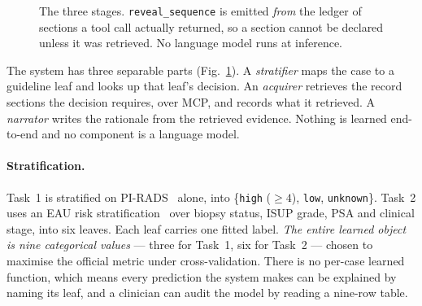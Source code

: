\documentclass[runningheads]{llncs}
\newcommand{\code}[1]{\texttt{\small #1}}
\begin{document}
\begin{figure}[t]
\centering
{}
\caption{The three stages. \code{reveal\_sequence} is emitted \emph{from} the
ledger of sections a tool call actually returned, so a section cannot be declared
unless it was retrieved. No language model runs at inference.}
\label{fig:arch}
\end{figure}

The system has three separable parts (Fig.~\ref{fig:arch}). A \emph{stratifier}
maps the case to a guideline leaf and looks up that leaf's decision. An
\emph{acquirer} retrieves the record sections the decision requires, over MCP, and
records what it retrieved. A \emph{narrator} writes the rationale from the
retrieved evidence. Nothing is learned end-to-end and no component is a language
model.

\paragraph{Stratification.}
Task~1 is stratified on PI-RADS~\cite{pirads} alone, into
\{\code{high} ($\geq 4$), \code{low}, \code{unknown}\}. Task~2 uses an EAU risk
stratification~\cite{eau} over biopsy status, ISUP grade, PSA and clinical stage,
into six leaves. Each leaf carries one fitted label. \emph{The entire learned
object is nine categorical values} --- three for Task~1, six for Task~2 --- chosen
to maximise the official metric under cross-validation. There is no per-case
learned function, which means every prediction the system makes can be explained by
naming its leaf, and a clinician can audit the model by reading a nine-row table.
\end{document}
